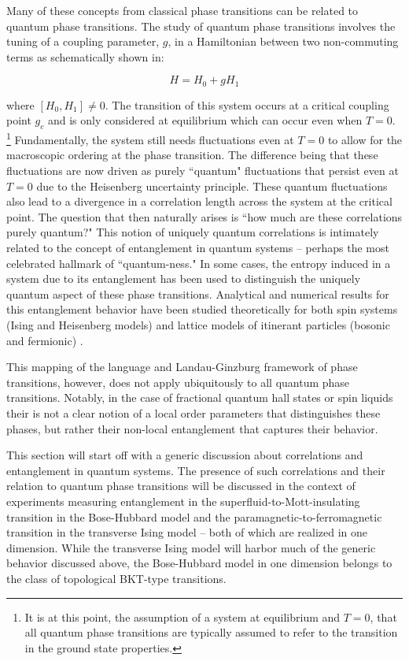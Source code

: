 Many of these concepts from classical phase transitions can be related to quantum phase transitions. The study of quantum phase transitions involves the tuning of a coupling parameter, $g$, in a Hamiltonian between two non-commuting terms as schematically shown in: 

\begin{equation}
\label{eqn:gHam}
H= H_0 + g H_1
\end{equation}

where $ [H_0,H_1]\neq0$. The transition of this system occurs at a critical coupling point $g_c$ and is only considered at equilibrium which can occur even when $T=0$. \footnote{It is at this point, the assumption of a system at equilibrium and $T=0$, that all quantum phase transitions are typically assumed to refer to the transition in the ground state properties.} Fundamentally, the system still needs fluctuations even at $T=0$ to allow for the macroscopic ordering at the phase transition. The difference being that these fluctuations are now driven as purely ``quantum" fluctuations that persist even at $T=0$ due to the Heisenberg uncertainty principle. These quantum fluctuations also lead to a divergence in a correlation length across the system at the critical point. The question that then naturally arises is ``how much are these correlations purely quantum?" This notion of uniquely quantum correlations is intimately related to the concept of entanglement in quantum systems -- perhaps the most celebrated hallmark of ``quantum-ness." In some cases, the entropy induced in a system due to its entanglement has been used to distinguish the uniquely quantum aspect of these phase transitions. Analytical and numerical results for this entanglement behavior have been studied theoretically for both spin systems (Ising and Heisenberg models) and lattice models of itinerant particles (bosonic and fermionic) \cite{Amico2008, Osterloh2002,Osborne2002}.

This mapping of the language and Landau-Ginzburg framework of phase transitions, however, does not apply ubiquitously to all quantum phase transitions. Notably, in the case of fractional quantum hall states\cite{Kitaev2005,Levin2006,Jiang2012} or spin liquids\cite{Zhang2011,Isakov2011} their is not a clear notion of a local order parameters that distinguishes these phases, but rather their non-local entanglement that captures their behavior. 

This section will start off with a generic discussion about correlations and entanglement in quantum systems. The presence of such correlations and their relation to quantum phase transitions will be discussed in the context of experiments measuring  entanglement in the superfluid-to-Mott-insulating transition in the Bose-Hubbard model and the paramagnetic-to-ferromagnetic transition in the transverse Ising model -- both of which are realized in one dimension. While the transverse Ising model will harbor much of the generic behavior discussed above, the Bose-Hubbard model in one dimension belongs to the class of topological BKT-type transitions.

